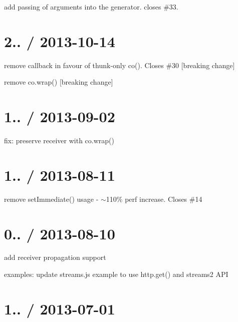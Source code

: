 \begin{DoxyItemize}
\item add passing of arguments into the generator. closes \#33.
\end{DoxyItemize}

\section*{2.. / 2013-\/10-\/14 }


\begin{DoxyItemize}
\item remove callback in favour of thunk-\/only co(). Closes \#30 \mbox{[}breaking change\mbox{]}
\item remove {\ttfamily co.\+wrap()} \mbox{[}breaking change\mbox{]}
\end{DoxyItemize}

\section*{1.. / 2013-\/09-\/02 }


\begin{DoxyItemize}
\item fix\+: preserve receiver with co.\+wrap()
\end{DoxyItemize}

\section*{1.. / 2013-\/08-\/11 }


\begin{DoxyItemize}
\item remove set\+Immediate() usage -\/ $\sim$110\% perf increase. Closes \#14
\end{DoxyItemize}

\section*{0.. / 2013-\/08-\/10 }


\begin{DoxyItemize}
\item add receiver propagation support
\item examples\+: update streams.\+js example to use {\ttfamily http.\+get()} and streams2 A\+PI
\end{DoxyItemize}

\section*{1.. / 2013-\/07-\/01 }


